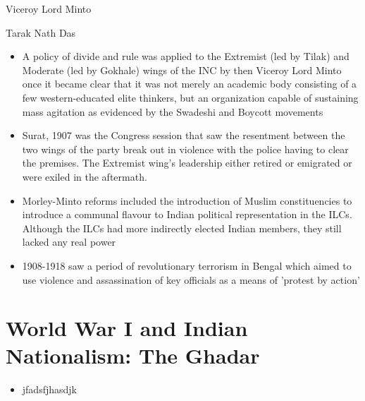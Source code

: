 \begin{marginfigure}[-4in]
    \caption{Viceroy Lord Minto}
    \vspace{0.8in}
    \caption{Tarak Nath Das}
\end{marginfigure}

\begin{itemize}
    \item A policy of divide and rule was applied to the Extremist (led by Tilak) and Moderate (led by Gokhale) wings of the INC by then Viceroy Lord Minto once it became clear that it was not merely an academic body consisting of a few western-educated elite thinkers, but an organization capable of sustaining mass agitation as evidenced by the Swadeshi and Boycott movements
    \item Surat, 1907 was the Congress session that saw the resentment between the two wings of the party break out in violence with the police having to clear the premises. The Extremist wing's leadership either retired or emigrated or were exiled in the aftermath.
    \item Morley-Minto reforms included the introduction of Muslim constituencies to introduce a communal flavour to Indian political representation in the ILCs. Although the ILCs had more indirectly elected Indian members, they still lacked any real power
    \item 1908-1918 saw a period of revolutionary terrorism in Bengal which aimed to use violence and assassination of key officials as a means of 'protest by action'
\end{itemize}

\section{World War I and Indian Nationalism: The Ghadar}
\begin{itemize}
    \item jfadsfjhasdjk
\end{itemize}

